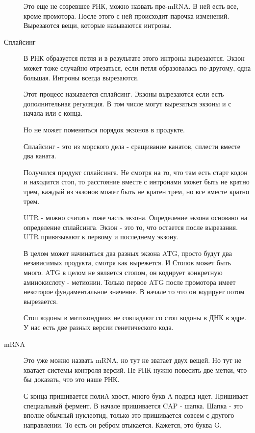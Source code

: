 \begin{description}
Это еще не созревшее РНК, можно 
назвать пре-mRNA. В ней есть 
все, кроме промотора. После этого 
с ней происходит парочка изменений. 
Вырезаются вещи, которые называются интроны. 

\item[Сплайсинг]

В РНК образуется петля и в результате этого 
интроны вырезаются. Экзон может тоже случайно отрезаться, 
если петля образовалась по-другому, 
одна большая. Интроны всегда вырезаются.

Этот процесс называется сплайсинг. Экзоны вырезаются если есть дополнительная регуляция. 
В том числе могут вырезаться экзоны и с начала или с конца. 

Но не может поменяться порядок экзонов в продукте. 

Сплайсинг - это из морского дела - сращивание канатов, сплести вместе два каната. 

Получился продукт сплайсинга. Не смотря на то, что там есть старт кодон и 
находится стоп, то расстояние вместе с интронами может быть не кратно трем, 
каждый из экзонов может быть не кратен трем, но все 
вместе кратно трем. 

UTR - можно считать тоже часть экзона. Определение экзона основано на 
определение сплайсинга. Экзон - это то, что остается после вырезания. 
UTR привязывают к первому и последнему экзону. 

В целом может начинаться два разных экзона ATG, просто 
будут два независимых продукта, смотря как вырежется. И Стопов 
может быть много. ATG в целом не является стопом, он кодирует 
конкретную аминокислоту - метионин. Только первое ATG после промотора имеет 
некоторое фундаментальное значение. В начале то что он кодирует потом вырезается. 

Стоп кодоны в митохондриях не совпадают 
со стоп кодоны в ДНК в ядре. У нас есть 
две разных версии генетического кода. 

\item[mRNA]

Это уже можно назвать mRNA, но тут не зватает двух вещей. Но тут 
не хватает системы контроля версий. Не РНК нужно повесить две метки, что 
бы доказать, что это наше РНК. 

С конца пришивается полиA хвост, много букв A подряд идет. Пришивает 
специальный фермент. В начале пришивается CAP - шапка. Шапка - это 
вполне обычный нуклеотид, только это пришивается совсем с другого 
направлении. То есть он ребром втыкается. Кажется, это буква G. 


\end{description}
